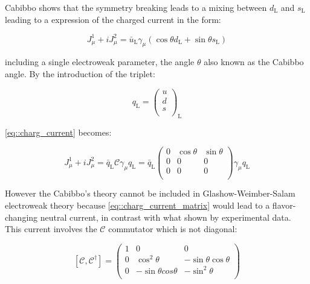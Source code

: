 Cabibbo shows that the symmetry breaking leads to a mixing between $d_{\text{L}}$ and $s_{\text{L}}$ leading to a expression of the charged current in the form:

\begin{equation}
J^{1}_{\mu} + i J^{2}_{\mu}= \bar{u}_{\text{L}}\gamma_{\mu} (\cos\theta d_{\text{L}} +\sin\theta s_{\text{L}})
\label{eq::charg_current}
\end{equation}

including a single electroweak parameter, the angle $\theta$ also known as the Cabibbo angle. By the introduction of the triplet:

\begin{equation}
q_{\text{L}} = 
\begin{pmatrix}
u \\
d \\
s \\
\end{pmatrix}
_{\text{L}}
\end{equation}

\autoref{eq::charg_current} becomes:

\begin{equation}
J^{1}_{\mu} + i J^{2}_{\mu} = \bar{q}_{\text{L}}\mathcal{C}\gamma_{\mu}q_{\text{L}} =  \bar{q}_{\text{L}}
\begin{pmatrix}
0 &\cos\theta &\sin\theta \\
0 &0 &0 \\
0 &0 &0\\
\end{pmatrix}
\gamma_{\mu}q_{\text{L}}
\label{eq::charg_current_matrix}
\end{equation}

However the Cabibbo's theory cannot be included in Glashow-Weimber-Salam electroweak theory because \autoref{eq::charg_current_matrix} would lead to a flavor-changing neutral current, in contrast with what shown by experimental data. This current involves the $\mathcal{C}$ commutator which is not diagonal:

\begin{equation}
\left[\mathcal{C}, \mathcal{C}^{\dagger} \right]
=
\begin{pmatrix}
1 &0 &0 \\
0 &\cos^{2}\theta &-\sin\theta \cos\theta \\
0 &-\sin\theta cos\theta &-\sin^{2}\theta\\
\end{pmatrix}
\end{equation}

